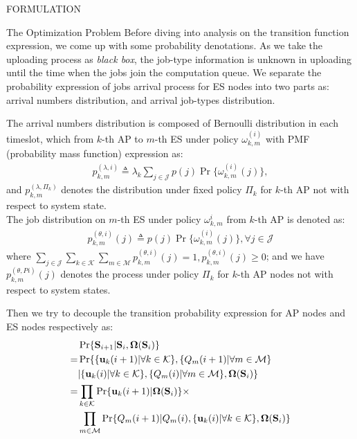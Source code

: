 \documentclass[10pt, conference, letterpaper]{IEEEtran}
\newcommand{\define}{\triangleq}
\renewcommand{\vec}{\mathbf}
\DeclarePairedDelimiter{\set}{\{}{\}}
\newcommand{\apSet}{\mathcal{K}}
\newcommand{\esSet}{\mathcal{M}}
\newcommand{\jSpace}{\mathcal{J}}
\newcommand{\Stat}{\mathbf{S}}
\newcommand{\Policy}{\mathbf{\Omega}}
\begin{document}
\begin{section}{FORMULATION}
\begin{subsection}{The Optimization Problem}
            Before diving into analysis on the transition function expression, we come up with some probability denotations. As we take the uploading process as \emph{black box}, the job-type information is unknown in uploading until the time when the jobs join the computation queue. We separate the probability expression of jobs arrival process for ES nodes into two parts as: arrival numbers distribution, and arrival job-types distribution.

            The arrival numbers distribution is composed of Bernoulli distribution in each timeslot, which from $k$-th AP to $m$-th ES under policy $\omega^{(i)}_{k,m}$ with PMF (probability mass function) expression as:
            \begin{align}
                p^{(\lambda,i)}_{k,m} \define \lambda_k \sum_{j\in\jSpace} p(j) \Pr\{\omega^{(i)}_{k,m}(j)\},
            \end{align}
            and $p^{(\lambda,\Pi_k)}_{k,m}$ denotes the distribution under fixed policy $\Pi_{k}$ for $k$-th AP not with respect to system state.
            \\
            The job distribution on $m$-th ES under policy $\omega^{i}_{k,m}$ from $k$-th AP is denoted as:
            \begin{align}
                p^{(\theta, i)}_{k,m}(j) \define p(j) \Pr\{\omega^{(i)}_{k,m}(j)\}, \forall j\in\jSpace
            \end{align}
            where $\sum_{j\in\jSpace}\sum_{k\in\apSet}\sum_{m\in\esSet} p^{(\theta, i)}_{k,m}(j)=1, p^{(\theta, i)}_{k,m}(j) \geq 0$; and we have $p^{(\theta,Pi)}_{k,m}(j)$ denotes the process under policy $\Pi_k$ for $k$-th AP nodes not with respect to system states.

            Then we try to decouple the transition probability expression for AP nodes and ES nodes respectively as:
            \begin{align}
                & \Pr\{\Stat_{i+1}|\Stat_{i}, \Policy(\Stat_{i})\} 
                \nonumber\\
                =& \Pr\{\set{\vec{u}_k(i+1)|\forall k\in\apSet}, \set{Q_m(i+1)|\forall m\in\esSet}
                    \nonumber\\
                    &|\set{\vec{u}_k(i)|\forall k\in\apSet}, \set{Q_m(i)|\forall m\in\esSet}, \Policy(\Stat_{i})\}
                \nonumber\\
                =& \prod_{k\in\apSet} \Pr\{\vec{u}_k(i+1)|\Policy(\Stat_{i})\} \times
                    \nonumber\\
                    & \prod_{m\in\esSet} \Pr\{Q_m(i+1)|Q_m(i), \set{\vec{u}_k(i)|\forall k\in\apSet}, \Policy(\Stat_{i})\}
            \end{align}
            

\end{subsection}
\end{section}
\end{document}
